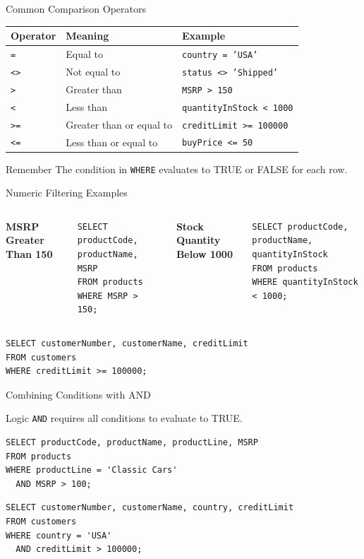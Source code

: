 \documentclass[aspectratio=169,11pt]{beamer}
\newcommand{\kw}[1]{\textcolor{sqlblue}{\texttt{#1}}}
\newcommand{\minihead}[1]{\vspace{2pt}\textbf{#1}\vspace{2pt}}
\begin{document}
\begin{frame}{Common Comparison Operators}
\begin{center}
\begin{tabular}{lll}
\toprule
\textbf{Operator} & \textbf{Meaning} & \textbf{Example} \\
\midrule
\texttt{=} & Equal to & \texttt{country = 'USA'} \\
\texttt{<>} & Not equal to & \texttt{status <> 'Shipped'} \\
\texttt{>} & Greater than & \texttt{MSRP > 150} \\
\texttt{<} & Less than & \texttt{quantityInStock < 1000} \\
\texttt{>=} & Greater than or equal to & \texttt{creditLimit >= 100000} \\
\texttt{<=} & Less than or equal to & \texttt{buyPrice <= 50} \\
\bottomrule
\end{tabular}
\end{center}
\begin{exampleblock}{Remember}
The condition in \kw{WHERE} evaluates to TRUE or FALSE for each row.
\end{exampleblock}
\end{frame}

\begin{frame}[fragile]{Numeric Filtering Examples}
\begin{columns}[T]
\minihead{MSRP Greater Than 150}
\begin{lstlisting}
SELECT productCode, productName, MSRP
FROM products
WHERE MSRP > 150;
\end{lstlisting}
\minihead{Stock Quantity Below 1000}
\begin{lstlisting}
SELECT productCode, productName, quantityInStock
FROM products
WHERE quantityInStock < 1000;
\end{lstlisting}
\end{columns}
\vspace{5pt}
\begin{lstlisting}
SELECT customerNumber, customerName, creditLimit
FROM customers
WHERE creditLimit >= 100000;
\end{lstlisting}
\end{frame}

\begin{frame}[fragile]{Combining Conditions with AND}
\begin{block}{Logic}
\kw{AND} requires all conditions to evaluate to TRUE.
\end{block}
\begin{lstlisting}
SELECT productCode, productName, productLine, MSRP
FROM products
WHERE productLine = 'Classic Cars'
  AND MSRP > 100;
\end{lstlisting}
\begin{lstlisting}
SELECT customerNumber, customerName, country, creditLimit
FROM customers
WHERE country = 'USA'
  AND creditLimit > 100000;
\end{lstlisting}
\end{frame}
\end{document}
